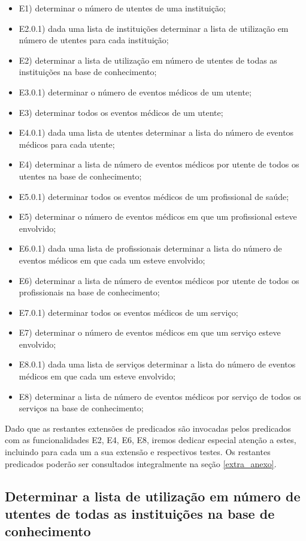 \documentclass[
  oneside,
  10pt, a4paper,
  footinclude=true,
  headinclude=true,
  cleardoublepage=empty
]{scrbook}
\begin{document}
\begin{itemize}
\item E1) determinar o número de utentes de uma instituição;
\item E2.0.1) dada uma lista de instituições determinar a lista de utilização em número de utentes para cada instituição;
\item E2) determinar a lista de utilização em número de utentes de todas as instituições na base de conhecimento;
\item E3.0.1) determinar o número de eventos médicos de um utente;
\item E3) determinar todos os eventos médicos de um utente;
\item E4.0.1) dada uma lista de utentes determinar a lista do número de eventos médicos para cada utente;
\item E4) determinar a lista de número de eventos médicos por utente de todos os utentes na base de conhecimento;
\item E5.0.1) determinar todos os eventos médicos de um profissional de saúde;
\item E5) determinar o número de eventos médicos em que um profissional esteve envolvido;
\item E6.0.1) dada uma lista de profissionais determinar a lista do número de eventos médicos em que cada um esteve envolvido;
\item E6) determinar a lista de número de eventos médicos por utente de todos os profissionais na base de conhecimento;
\item E7.0.1) determinar todos os eventos médicos de um serviço;
\item E7) determinar o número de eventos médicos em que um serviço esteve envolvido;
\item E8.0.1) dada uma lista de serviços determinar a lista do número de eventos médicos em que cada um esteve envolvido;
\item E8) determinar a lista de número de eventos médicos por serviço de todos os serviços na base de conhecimento;
\end{itemize}

Dado que as restantes extensões de predicados são invocadas pelos predicados com as funcionalidades E2, E4, E6, E8, iremos dedicar especial atenção a estes, incluindo para cada um a sua extensão e respectivos testes. Os restantes predicados poderão ser consultados integralmente na seção \ref{extra_anexo}.

\subsection{Determinar a lista de utilização em número de utentes de todas as instituições na base de conhecimento}
\end{document}

